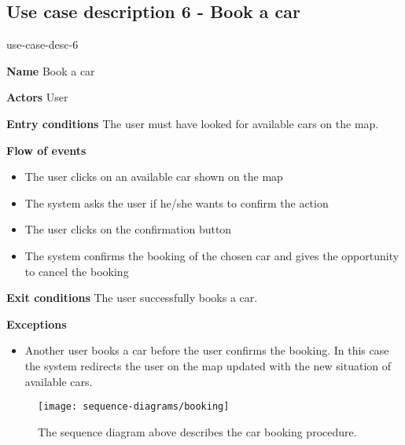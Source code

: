 \subsection{Use case description 6 - Book a car}
\begin{labeling}{use-case-desc-6}
	\item[\textbf{Name}] Book a car
	\item[\textbf{Actors}] User
	\item[\textbf{Entry conditions}] The user must have looked for available cars on the map.
	\item[\textbf{Flow of events}]
		\begin{itemize}
			\item[]
			\item The user clicks on an available car shown on the map
			\item The system asks the user if he/she wants to confirm the action
			\item The user clicks on the confirmation button
			\item The system confirms the booking of the chosen car and gives the opportunity to cancel the booking
		\end{itemize}
	\item[\textbf{Exit conditions}] The user successfully books a car.
	\item[\textbf{Exceptions}]
		\begin{itemize}
			\item[]
			\item Another user books a car before the user confirms the booking. In this case the system redirects the user on the map updated with the new situation of available cars.
		\end{itemize}
\end{labeling}
\begin{figure}[H]
	\centering
	\texttt{[image: sequence-diagrams/booking]}
	\caption[Sequence diagram - Book a car]{The sequence diagram above describes the car booking procedure.}
	\label{fig:booking-sequence-diagram}
\end{figure}
\clearpage

